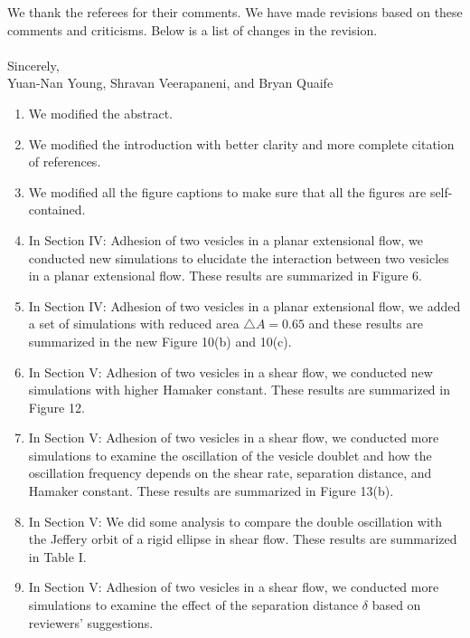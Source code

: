 \documentclass[11pt]{article}
\begin{document}
\noindent
We thank the referees for their comments.   We have made revisions based on these comments and criticisms.
Below is a list of changes in the revision.
\\ \\ \noindent 
Sincerely, \\ \noindent
Yuan-Nan Young, Shravan Veerapaneni, and Bryan Quaife

\vspace{20pt}

\begin{enumerate}

\item We modified the abstract.

\item We modified the introduction with better clarity and more complete citation of references.

\item We modified all the figure captions to make sure that all the figures are self-contained.

\item In Section IV: Adhesion of two vesicles in a planar extensional
  flow, we conducted new simulations to elucidate the interaction
    between two vesicles in a planar extensional flow. These results are
    summarized in Figure 6.

\item In Section IV: Adhesion of two vesicles in a planar extensional flow, we added a set of simulations with reduced area $\triangle A=0.65$ and these results are summarized in the new Figure 10(b) and 10(c).

\item In Section V: Adhesion of two vesicles in a shear flow, we conducted new  simulations with higher Hamaker constant. These results are summarized in Figure 12.

\item In Section V: Adhesion of two vesicles in a shear flow, we conducted more simulations to examine the oscillation of the vesicle doublet and how the oscillation frequency depends on 
the shear rate, separation distance, and Hamaker constant. These results are summarized in Figure 13(b). 
    
\item In Section V: We did some analysis to compare the double
  oscillation with the Jeffery orbit of a rigid ellipse in shear flow.
    These results are summarized in Table I.

\item In Section V: Adhesion of two vesicles in a shear flow, we
  conducted more simulations to examine the effect of the separation
    distance $\delta$ based on reviewers' suggestions.


\end{enumerate}
\end{document}
